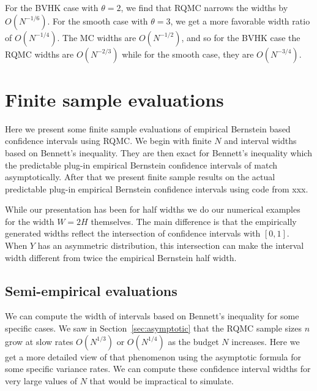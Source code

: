 \documentclass{article}
\newcommand{\art}[1]{\begingroup\color{blue}#1\endgroup}
\newcommand{\aadit}[1]{\begingroup\color{orange}#1\endgroup}
\begin{document}



For the BVHK case with $\theta=2$, 
we find that RQMC narrows the widths by $O(N^{-1/6})$.
For the smooth case with $\theta=3$,
we get a more favorable width ratio of $O(N^{-1/4})$.
The MC widths are $O(N^{-1/2})$, and so for the
BVHK case the RQMC widths are $O(N^{-2/3})$
while for the smooth case, they are $O(N^{-3/4})$.


\section{Finite sample evaluations}\label{sec:finite}

Here we present some finite sample evaluations
of empirical Bernstein based confidence intervals
using RQMC.  We begin with finite $N$ and interval
widths based on Bennett's inequality.  They are
then exact for Bennett's inequality which the
predictable plug-in empirical Bernstein confidence intervals
of \cite{WauRam24a} match asymptotically.
After that we present finite sample results on the
actual predictable plug-in empirical Bernstein confidence
intervals using code from \art{xxx}.

While our presentation has been for half widths
we do our numerical examples for the \art{width $W=2H$}
themselves.  The \art{main} difference is that the
empirically generated widths reflect the intersection
of confidence intervals with $[0,1]$.  When $Y$ has
an asymmetric distribution, this intersection can
make the interval width different from twice the
empirical Bernstein half width.

\subsection{Semi-empirical evaluations}\label{sec:semiempirical}

We can compute the width of intervals based on Bennett's inequality
for some specific cases.  We saw in Section~\ref{sec:asymptotic}
that the RQMC sample sizes $n$ grow at slow rates
$O(N^{1/3})$ or $O(N^{1/4})$ as the budget $N$ increases.
Here we get a more detailed view of that phenomenon using
the asymptotic formula for some specific variance rates.
We can compute these confidence interval widths for very
large values of $N$ that would be impractical to simulate.
\end{document}
